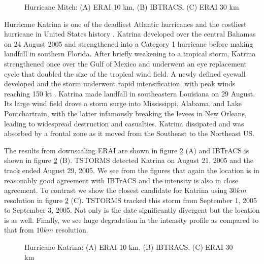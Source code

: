 \begin{figure}[!tbp]
\centering
\caption{Hurricane Mitch: (A) ERAI 10 km, (B) IBTRACS, (C) ERAI 30 km}
\label{mitch_tracks}
\end{figure}

Hurricane Katrina is one of the deadliest Atlantic hurricanes and the costliest hurricane in United States history \cite{bevin}.  Katrina developed over the central Bahamas on 24 August 2005 and strengthened into a Category 1 hurricane before making landfall in southern Florida.  After briefly weakening to a tropical storm, Katrina strengthened once over the Gulf of Mexico and underwent an eye replacement cycle that doubled the size of the tropical wind field.  A newly defined eyewall developed and the storm underwent rapid intensification, with peak winds reaching 150 kt \cite{bevin}.  Katrina made landfall in southeastern Louisiana on 29 August.  Its large wind field drove a storm surge into Mississippi, Alabama, and Lake Pontchartrain, with the latter infamously breaking the levees in New Orleans, leading to widespread destruction and casualties.  Katrina dissipated and was absorbed by a frontal zone as it moved from the Southeast to the Northeast US.
\par
The results from downscaling ERAI are shown in figure \ref{katrina_tracks} (A) and IBTrACS is shown in figure \ref{katrina_tracks} (B). TSTORMS detected Katrina on August 21, 2005 and the track ended August 29, 2005. We see from the figures that again the location is in reasonably good agreement with IBTrACS and the intensity is also in close agreement. To contrast we show the closest candidate for Katrina using $30km$ resolution in figure \ref{katrina_tracks} (C). TSTORMS tracked this storm from September 1, 2005 to September 3, 2005. Not only is the date significantly divergent but the location is as well. Finally, we see huge degradation in the intensity profile as compared to that from $10km$ resolution.    

\begin{figure}[!tbp]
\centering
\caption{Hurricane Katrina: (A) ERAI 10 km, (B) IBTRACS, (C) ERAI 30 km}
\label{katrina_tracks}
\end{figure}

